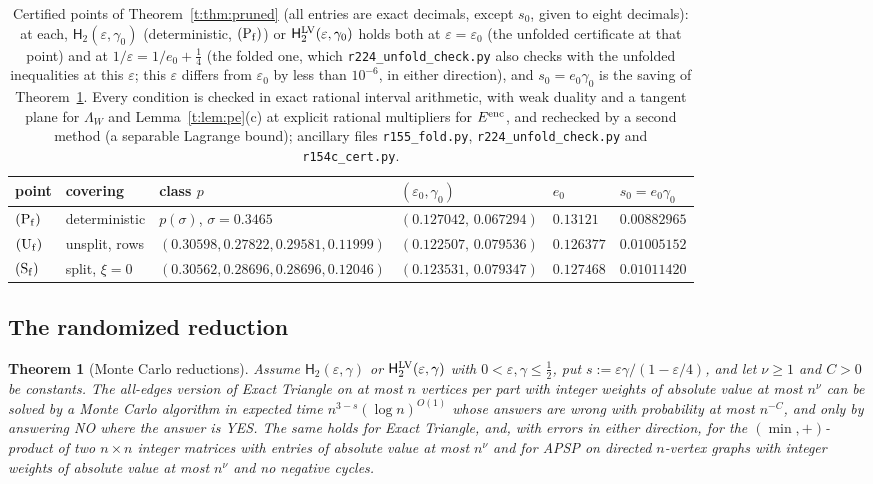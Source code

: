 \documentclass[11pt]{article}
\newtheorem{theorem}{Theorem}[section]
\theoremstyle{definition}
\theoremstyle{remark}
\newcommand{\Hyp}{\mathsf{H}}
\begin{document}
\begin{table}[ht]
\centering\footnotesize
\renewcommand{\arraystretch}{1.15}\setlength{\tabcolsep}{2.5pt}
\begin{tabular}{@{}llllll@{}}
point & covering & class $p$ & $(\varepsilon_0,\gamma_0)$ & $e_0$ & $s_0=e_0\gamma_0$\\\hline
$(\mathrm P_{\rm f})$ & deterministic & $p(\sigma)$, $\sigma=0.3465$ & $(0.127042,\,0.067294)$ & $0.13121$ & $0.00882965$\\
$(\mathrm U_{\rm f})$ & unsplit, rows & $(0.30598,0.27822,0.29581,0.11999)$ & $(0.122507,\,0.079536)$ & $0.126377$ & $0.01005152$\\
$(\mathrm S_{\rm f})$ & split, $\xi=0$ & $(0.30562,0.28696,0.28696,0.12046)$ & $(0.123531,\,0.079347)$ & $0.127468$ & $0.01011420$
\end{tabular}
\caption{Certified points of Theorem~\ref{t:thm:pruned} (all entries are exact decimals, except $s_0$, given to eight decimals): at each, $\Hyp_2(\varepsilon,\gamma_0)$ (deterministic, $(\mathrm P_{\rm f})$) or $\Hyp_2^{\rm LV}(\varepsilon,\gamma_0)$ holds both at $\varepsilon=\varepsilon_0$ (the unfolded certificate at that point) and at $1/\varepsilon=1/e_0+\frac14$ (the folded one, which \texttt{r224\_unfold\_check.py} also checks with the unfolded inequalities at this $\varepsilon$; this $\varepsilon$ differs from $\varepsilon_0$ by less than $10^{-6}$, in either direction), and $s_0=e_0\gamma_0$ is the saving of Theorem~\ref{t:thm:mc}. Every condition is checked in exact rational interval arithmetic, with weak duality and a tangent plane for $\Lambda_W$ and Lemma~\ref{t:lem:pe}(c) at explicit rational multipliers for $E^{\rm enc}$, and rechecked by a second method (a separable Lagrange bound); ancillary files \texttt{r155\_fold.py}, \texttt{r224\_unfold\_check.py} and \texttt{r154c\_cert.py}.}
\label{t:tab:cert}
\end{table}

\subsection{The randomized reduction}\label{t:sec:mcred}

\begin{theorem}[Monte Carlo reductions]\label{t:thm:mc}
Assume $\Hyp_2(\varepsilon,\gamma)$ or $\Hyp_2^{\rm LV}(\varepsilon,\gamma)$ with $0<\varepsilon,\gamma\le\frac12$, put $s:=\varepsilon\gamma/(1-\varepsilon/4)$, and let $\nu\ge1$ and $C>0$ be constants. The all-edges version of Exact Triangle on at most $n$ vertices per part with integer weights of absolute value at most $n^\nu$ can be solved by a Monte Carlo algorithm in expected time $n^{3-s}(\log n)^{O(1)}$ whose answers are wrong with probability at most $n^{-C}$, and only by answering NO where the answer is YES. The same holds for Exact Triangle, and, with errors in either direction, for the $(\min,+)$-product of two $n\times n$ integer matrices with entries of absolute value at most $n^\nu$ and for APSP on directed $n$-vertex graphs with integer weights of absolute value at most $n^\nu$ and no negative cycles.
\end{theorem}
\end{document}
